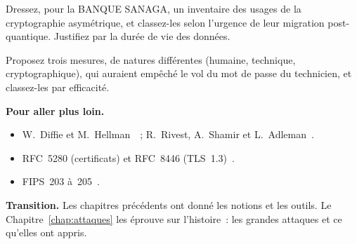 \begin{boxexo}[title={\ding{45}\quad Exercice~4.9. Inventaire post-quantique \niveauexpert}]
Dressez, pour la BANQUE SANAGA, un inventaire des usages de la
cryptographie asymétrique, et classez-les selon l'urgence de leur
migration post-quantique. Justifiez par la durée de vie des données.
\end{boxexo}

\begin{boxexo}[title={\ding{45}\quad Exercice~4.10. La fausse page \niveauexpert}]
Proposez trois mesures, de natures différentes (humaine, technique,
cryptographique), qui auraient empêché le vol du mot de passe du
technicien, et classez-les par efficacité.
\end{boxexo}

\bigskip

\begin{boxinfo}
\textbf{Pour aller plus loin.}
\begin{itemize}
    \item W.~Diffie et M.~Hellman~\cite{diffie1976}~; R.~Rivest, A.~Shamir
          et L.~Adleman~\cite{rivest1978}.
    \item RFC~5280 (certificats) et RFC~8446 (TLS~1.3)~\cite{rfc5280,rfc8446}.
    \item FIPS~203 à~205~\cite{fips203,fips204,fips205}.
\end{itemize}
\end{boxinfo}

\begin{boxinfo}
\textbf{Transition.} Les chapitres précédents ont donné les notions et les
outils. Le Chapitre~\ref{chap:attaques} les éprouve sur l'histoire~: les
grandes attaques et ce qu'elles ont appris.
\end{boxinfo}
